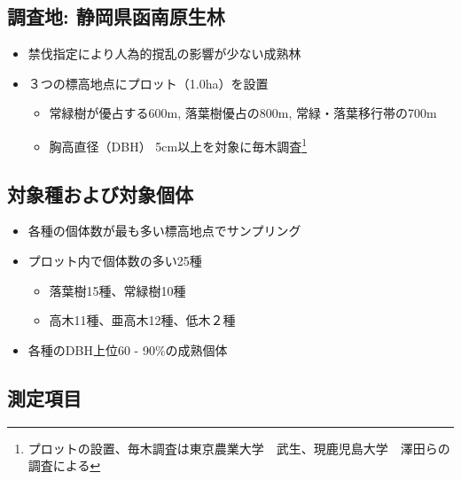 \documentclass[a0, 30pt, plainboxedsections]{sciposter} %
\begin{document}
\begin{multicols}{3}\footnotesize{

\subsection*{\small{調査地: 静岡県函南原生林}}

\begin{itemize}\setlength{\itemindent}{1em}
  \item 禁伐指定により人為的撹乱の影響が少ない成熟林
  \item ３つの標高地点にプロット（1.0ha）を設置
  \begin{itemize}\setlength{\itemindent}{1em}
    \item 常緑樹が優占する600m, 落葉樹優占の800m, \newline 常緑・落葉移行帯の700m
    \item 胸高直径（DBH） 5cm以上を対象に毎木調査\footnote{プロットの設置、毎木調査は東京農業大学　武生、現鹿児島大学　澤田らの調査による}
  \end{itemize}
\end{itemize}


\subsection*{\small{対象種および対象個体}}

\begin{itemize}\setlength{\itemindent}{1em}
  \item 各種の個体数が最も多い標高地点でサンプリング
  \item プロット内で個体数の多い25種
  \begin{itemize}\setlength{\itemindent}{1em}
    \item 落葉樹15種、常緑樹10種
    \item 高木11種、亜高木12種、低木２種
  \end{itemize}
  \item 各種のDBH上位60 - 90\%の成熟個体
\end{itemize}

\columnbreak
\subsection*{\small{測定項目}}

}
\end{multicols}
\end{document}
